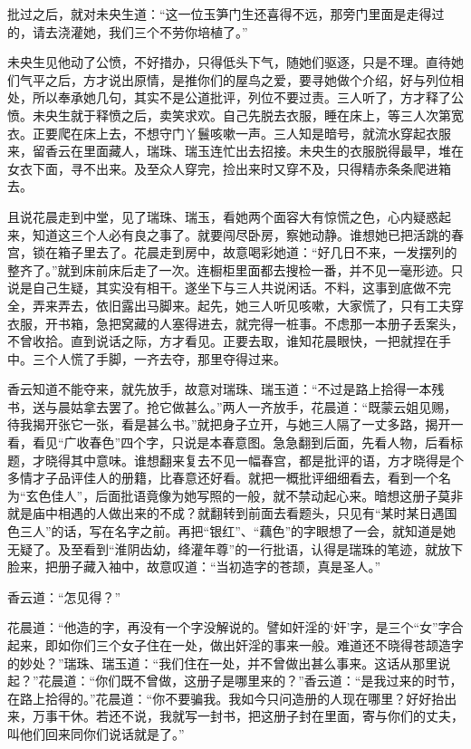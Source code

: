 \documentclass[a4paper,12pt,UTF8,twoside]{ctexbook}
\begin{document}
批过之后，就对未央生道：“这一位玉笋门生还喜得不远，那旁门里面是走得过的，请去浇灌她，我们三个不劳你培植了。”

未央生见他动了公愤，不好措办，只得低头下气，随她们驱逐，只是不理。直待她们气平之后，方才说出原情，是推你们的屋鸟之爱，要寻她做个介绍，好与列位相处，所以奉承她几句，其实不是公道批评，列位不要过责。三人听了，方才释了公愤。未央生就于释愤之后，卖笑求欢。自己先脱去衣服，睡在床上，等三人次第宽衣。正要爬在床上去，不想守门丫鬟咳嗽一声。三人知是暗号，就流水穿起衣服来，留香云在里面藏人，瑞珠、瑞玉连忙出去招接。未央生的衣服脱得最早，堆在女衣下面，寻不出来。及至众人穿完，捡出来时又穿不及，只得精赤条条爬进箱去。

且说花晨走到中堂，见了瑞珠、瑞玉，看她两个面容大有惊慌之色，心内疑惑起来，知道这三个人必有良之事了。就要闯尽卧房，察她动静。谁想她已把活跳的春宫，锁在箱子里去了。花晨走到房中，故意喝彩她道：“好几日不来，一发摆列的整齐了。”就到床前床后走了一次。连橱柜里面都去搜检一番，并不见一毫形迹。只说是自己生疑，其实没有相干。遂坐下与三人共说闲话。不料，这事到底做不完全，弄来弄去，依旧露出马脚来。起先，她三人听见咳嗽，大家慌了，只有工夫穿衣服，开书箱，急把窝藏的人塞得进去，就完得一桩事。不虑那一本册子丢案头，不曾收拾。直到说话之际，方才看见。正要去取，谁知花晨眼快，一把就捏在手中。三个人慌了手脚，一齐去夺，那里夺得过来。

香云知道不能夺来，就先放手，故意对瑞珠、瑞玉道：“不过是路上拾得一本残书，送与晨姑拿去罢了。抢它做甚么。”两人一齐放手，花晨道：“既蒙云姐见赐，待我揭开张它一张，看是甚么书。”就把身子立开，与她三人隔了一丈多路，揭开一看，看见“广收春色”四个字，只说是本春意图。急急翻到后面，先看人物，后看标题，才晓得其中意味。谁想翻来复去不见一幅春宫，都是批评的语，方才晓得是个多情才子品评佳人的册籍，比春意还好看。就把一概批评细细看去，看到一个名为“玄色佳人”，后面批语竟像为她写照的一般，就不禁动起心来。暗想这册子莫非就是庙中相遇的人做出来的不成？就翻转到前面去看题头，只见有“某时某日遇国色三人”的话，写在名字之前。再把“银红”、“藕色”的字眼想了一会，就知道是她无疑了。及至看到“淮阴齿幼，绛灌年尊”的一行批语，认得是瑞珠的笔迹，就放下脸来，把册子藏入袖中，故意叹道：“当初造字的苍颉，真是圣人。”

香云道：“怎见得？”

花晨道：“他造的字，再没有一个字没解说的。譬如奸淫的‘奸’字，是三个“女”字合起来，即如你们三个女子住在一处，做出奸淫的事来一般。难道还不晓得苍颉造字的妙处？”瑞珠、瑞玉道：“我们住在一处，并不曾做出甚么事来。这话从那里说起？”花晨道：“你们既不曾做，这册子是哪里来的？”香云道：“是我过来的时节，在路上拾得的。”花晨道：“你不要骗我。我如今只问造册的人现在哪里？好好抬出来，万事干休。若还不说，我就写一封书，把这册子封在里面，寄与你们的丈夫，叫他们回来同你们说话就是了。”
\end{document}
